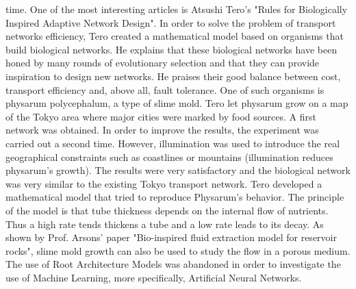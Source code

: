time.
One of the most interesting articles is Atsushi Tero’s "Rules for Biologically Inspired
Adaptive Network Design". In order to solve the problem of transport networks efficiency,
Tero created a mathematical model based on organisms that build biological networks. He
explains that these biological networks have been honed by many rounds of evolutionary
selection and that they can provide inspiration to design new networks. He praises their
good balance between cost, transport efficiency and, above all, fault tolerance. One of
such organisms is physarum polycephalum, a type of slime mold. Tero let physarum
grow on a map of the Tokyo area where major cities were marked by food sources. A
first network was obtained. In order to improve the results, the experiment was carried
out a second time. However, illumination was used to introduce the real geographical
constraints such as coastlines or mountains (illumination reduces physarum’s growth). The
results were very satisfactory and the biological network was very similar to the existing
Tokyo transport network. Tero developed a mathematical model that tried to reproduce
Physarum’s behavior. The principle of the model is that tube thickness depends on the
internal flow of nutrients. Thus a high rate tends thickens a tube and a low rate leads
to its decay. As shown by Prof. Arsons’ paper "Bio-inspired fluid extraction model for
reservoir rocks", slime mold growth can also be used to study the flow in a porous medium.
The use of Root Architecture Models was abandoned in order to investigate the use of Machine Learning,
 more specifically, Artificial Neural Networks.


